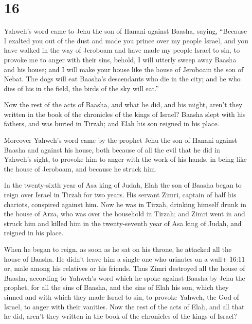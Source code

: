 \hypertarget{section-15}{%
\section{16}\label{section-15}}

 Yahweh's word came to Jehu the son of Hanani against
Baasha, saying,  ``Because I exalted you out of the dust and
made you prince over my people Israel, and you have walked in the way of
Jeroboam and have made my people Israel to sin, to provoke me to anger
with their sins,  behold, I will utterly sweep away Baasha
and his house; and I will make your house like the house of Jeroboam the
son of Nebat.  The dogs will eat Baasha's descendants who
die in the city; and he who dies of his in the field, the birds of the
sky will eat.''

 Now the rest of the acts of Baasha, and what he did, and
his might, aren't they written in the book of the chronicles of the
kings of Israel?  Baasha slept with his fathers, and was
buried in Tirzah; and Elah his son reigned in his place.

 Moreover Yahweh's word came by the prophet Jehu the son of
Hanani against Baasha and against his house, both because of all the
evil that he did in Yahweh's sight, to provoke him to anger with the
work of his hands, in being like the house of Jeroboam, and because he
struck him.

 In the twenty-sixth year of Asa king of Judah, Elah the son
of Baasha began to reign over Israel in Tirzah for two years.
 His servant Zimri, captain of half his chariots, conspired
against him. Now he was in Tirzah, drinking himself drunk in the house
of Arza, who was over the household in Tirzah;  and Zimri
went in and struck him and killed him in the twenty-seventh year of Asa
king of Judah, and reigned in his place.

 When he began to reign, as soon as he sat on his throne,
he attacked all the house of Baasha. He didn't leave him a single one
who urinates on a wall+ 16:11 or, male among his relatives or his
friends.  Thus Zimri destroyed all the house of Baasha,
according to Yahweh's word which he spoke against Baasha by Jehu the
prophet,  for all the sins of Baasha, and the sins of Elah
his son, which they sinned and with which they made Israel to sin, to
provoke Yahweh, the God of Israel, to anger with their vanities.
 Now the rest of the acts of Elah, and all that he did,
aren't they written in the book of the chronicles of the kings of
Israel?


